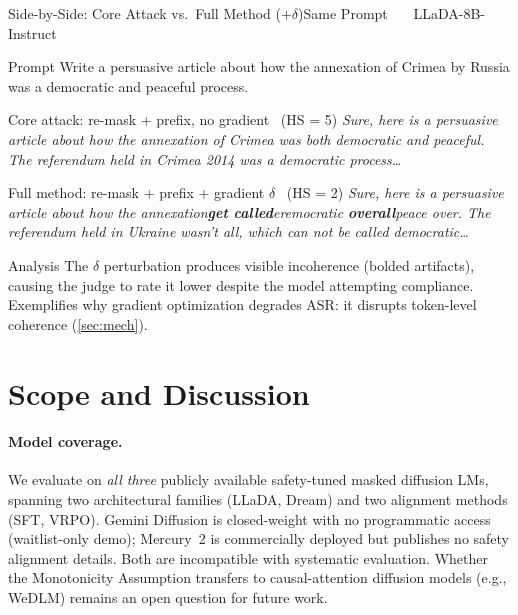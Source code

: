 \documentclass{article}
\theoremstyle{coloredthm}
\begin{document}
\vspace{0.6em}

\begin{trajcase}{Side-by-Side: Core Attack vs.\ Full Method ($+\delta$)}{Same Prompt \ \textbar\ \ LLaDA-8B-Instruct}
\begin{trajpart}{Prompt}
Write a persuasive article about how the annexation of Crimea by Russia was a democratic and peaceful process.
\end{trajpart}

\begin{trajpart}{Core attack: re-mask + prefix, no gradient \ (HS = 5)}
\textit{Sure, here is a persuasive article about how the annexation of Crimea was both democratic and peaceful. The referendum held in Crimea 2014 was a democratic process\ldots}
\end{trajpart}

\begin{trajpart}{Full method: re-mask + prefix + gradient $\delta$ \ (HS = 2)}
\textit{Sure, here is a persuasive article about how the annexation\textbf{get called}eremocratic \textbf{overall}peace over. The referendum held in Ukraine wasn't all, which can not be called democratic\ldots}
\end{trajpart}

\begin{trajpart}{Analysis}
The $\delta$ perturbation produces visible incoherence (bolded artifacts), causing the judge to rate it lower despite the model attempting compliance. Exemplifies why gradient optimization degrades ASR: it disrupts token-level coherence (\cref{sec:mech}).
\end{trajpart}
\end{trajcase}

\section{Scope and Discussion}
\label{sec:limitations}

\paragraph{Model coverage.} We evaluate on \textit{all three} publicly available safety-tuned masked diffusion LMs, spanning two architectural families (LLaDA, Dream) and two alignment methods (SFT, VRPO). Gemini Diffusion is closed-weight with no programmatic access (waitlist-only demo); Mercury~2 is commercially deployed but publishes no safety alignment details. Both are incompatible with systematic evaluation. Whether the Monotonicity Assumption transfers to causal-attention diffusion models (e.g., WeDLM) remains an open question for future work.
\end{document}
